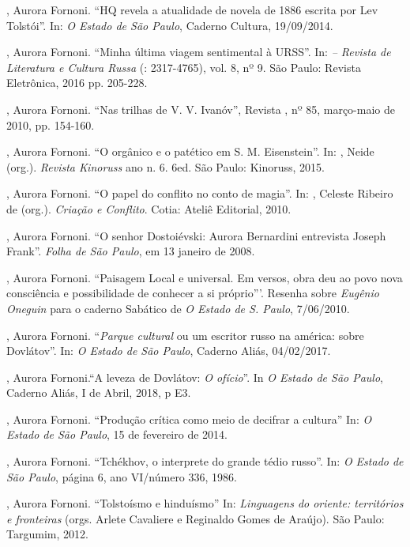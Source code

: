 , Aurora Fornoni. ``HQ revela a atualidade de novela de 1886
escrita por Lev Tolstói''. In: \emph{O Estado de São Paulo}, Caderno
Cultura, 19/09/2014.

, Aurora Fornoni. ``Minha última viagem sentimental à URSS''.
In:\emph{ -- Revista de Literatura e Cultura Russa} (:
2317-4765), vol. 8, nº 9. São Paulo: Revista Eletrônica, 2016 pp.
205-228.

, Aurora Fornoni. ``Nas trilhas de V. V. Ivanóv'', Revista
, nº 85, março-maio de 2010, pp. 154-160.

, Aurora Fornoni. ``O orgânico e o patético em S. M.
Eisenstein''. In: , Neide (org.). \emph{Revista Kinoruss} ano 
n. 6. 6ed. São Paulo: Kinoruss, 2015.

, Aurora Fornoni. ``O papel do conflito no conto de magia''.
In: , Celeste Ribeiro de (org.). \emph{Criação e Conflito}. Cotia:
Ateliê Editorial, 2010.

, Aurora Fornoni. ``O senhor Dostoiévski: Aurora Bernardini
entrevista Joseph Frank''. \emph{Folha de São Paulo}, em 13 janeiro de
2008.

, Aurora Fornoni. ``Paisagem Local e universal. Em versos,
obra deu ao povo nova consciência e possibilidade de conhecer a si
próprio'''. Resenha sobre \emph{Eugênio Oneguin} para o caderno Sabático
de \emph{O Estado de S. Paulo}, 7/06/2010. 

, Aurora Fornoni. ``\emph{Parque cultural} ou um escritor
russo na américa: sobre Dovlátov''. In: \emph{O Estado de São Paulo},
Caderno Aliás, 04/02/2017.

, Aurora Fornoni.``A leveza de Dovlátov: \emph{O ofício}''. In
\emph{O Estado de São Paulo}, Caderno Aliás, I de Abril, 2018, p E3.

, Aurora Fornoni. ``Produção crítica como meio de decifrar a
cultura'' In: \emph{O Estado de São Paulo}, 15 de fevereiro de 2014.

, Aurora Fornoni. ``Tchékhov, o interprete do grande tédio
russo''. In: \emph{O Estado de São Paulo}, página 6, ano VI/número 336,
1986.

, Aurora Fornoni. ``Tolstoísmo e hinduísmo'' In:
\emph{Linguagens do oriente: territórios e fronteiras} (orgs. Arlete
Cavaliere e Reginaldo Gomes de Araújo). São Paulo: Targumim, 2012.

